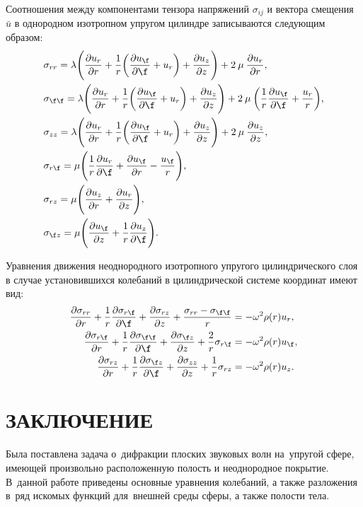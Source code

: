 Соотношения между компонентами тензора напряжений $\sigma_{ij}$ и вектора смещения $\bar{u}$ в однородном изотропном упругом цилиндре записываются следующим образом:
\begin{align}
&\sigma_{rr}=\lambda\Biggl(\frac{\partial u_r}{\partial r}+\frac{1}{r}\biggl(\frac{\partial u_\f}{\partial\f}+u_r\biggr)+\frac{\partial u_z}{\partial z}\Biggr)+2\:\mu\:\frac{\partial u_r}{\partial r},\\
&\sigma_{\f\f}=\lambda\Biggl(\frac{\partial u_r}{\partial r}+\frac{1}{r}\biggl(\frac{\partial u_\f}{\partial\f}+u_r\biggr)+\frac{\partial u_z}{\partial z}\Biggr)+2\:\mu\:\biggl(\frac{1}{r}\frac{\partial u_\f}{\partial\f}+\frac{u_r}{r}\biggr),\\
&\sigma_{zz}=\lambda\Biggl(\frac{\partial u_r}{\partial r}+\frac{1}{r}\biggl(\frac{\partial u_\f}{\partial\f}+u_r\biggr)+\frac{\partial u_z}{\partial z}\Biggr)+2\:\mu\:\frac{\partial u_z}{\partial z},\\
&\sigma_{r\f}=\mu\Biggl(\frac{1}{r}\frac{\partial u_r}{\partial\f}+\frac{\partial u_\f}{\partial r}-\frac{u_{\f}}{r}\Biggr),\\
&\sigma_{rz}=\mu\Biggl(\frac{\partial u_z}{\partial r}+\frac{\partial u_r}{\partial z}\Biggr),\\
&\sigma_{\f z}=\mu\Biggl(\frac{\partial u_\f}{\partial z}+\frac{1}{r}\frac{\partial u_z}{\partial \f}\Biggr).
\end{align}

Уравнения движения неоднородного изотропного упругого цилиндрического слоя в случае установившихся колебаний в цилиндрической системе координат имеют вид:
\begin{align}
\frac{\partial\sigma_{rr}}{
\partial r}+\frac{1}{r}\frac{\partial\sigma_{r\f}}{\partial\f}+\frac{\partial\sigma_{rz}}{\partial z}+\frac{\sigma_{rr}-\sigma_{\f\f}}{r}&=-\omega^2\rho(r)u_r,\\
\frac{\partial\sigma_{r\f}}{
\partial r}+\frac{1}{r}\frac{\partial\sigma_{\f\f}}{\partial\f}+\frac{\partial\sigma_{\f z}}{\partial z}+\frac{2}{r}\sigma_{r\f}&=-\omega^2\rho(r)u_{\f},\\
\frac{\partial\sigma_{rz}}{
\partial r}+\frac{1}{r}\frac{\partial\sigma_{\f z}}{\partial\f}+\frac{\partial\sigma_{zz}}{\partial z}+\frac{1}{r}\sigma_{rz}&=-\omega^2\rho(r)u_z.
\end{align}

\newpage
\section*{ЗАКЛЮЧЕНИЕ}
Была поставлена задача о~дифракции плоских звуковых волн на~упругой сфере, имеющей произвольно расположенную полость и неоднородное покрытие. В~данной работе приведены основные уравнения колебаний, а также разложения в~ряд искомых функций для~внешней среды сферы, а также полости тела.

